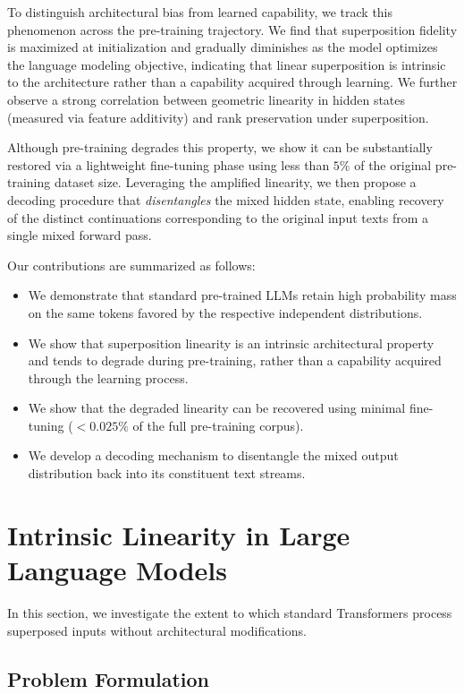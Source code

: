 \documentclass{article}
\theoremstyle{plain}
\theoremstyle{definition}
\theoremstyle{remark}
\begin{document}
To distinguish architectural bias from learned capability, we track this phenomenon across the pre-training trajectory. We find that superposition fidelity is maximized at initialization and gradually diminishes as the model optimizes the language modeling objective, indicating that linear superposition is intrinsic to the architecture rather than a capability acquired through learning. We further observe a strong correlation between geometric linearity in hidden states (measured via feature additivity) and rank preservation under superposition.

Although pre-training degrades this property, we show it can be substantially restored via a lightweight fine-tuning phase using less than $5\%$ of the original pre-training dataset size. Leveraging the amplified linearity, we then propose a decoding procedure that \textit{disentangles} the mixed hidden state, enabling recovery of the distinct continuations corresponding to the original input texts from a single mixed forward pass.

Our contributions are summarized as follows:
\begin{itemize}
    \item We demonstrate that standard pre-trained LLMs retain high probability mass on the same tokens favored by the respective independent distributions.
    \item We show that superposition linearity is an intrinsic architectural property and tends to degrade during pre-training, rather than a capability acquired through the learning process.
    \item We show that the degraded linearity can be recovered using minimal fine-tuning ($<0.025\%$ of the full pre-training corpus).
    \item We develop a decoding mechanism to disentangle the mixed output distribution back into its constituent text streams.
\end{itemize}

\section{Intrinsic Linearity in Large Language Models}
\label{sec:intrinsic_linearity}

In this section, we investigate the extent to which standard Transformers process superposed inputs without architectural modifications.

\subsection{Problem Formulation}
\label{subsec:formulation}
\end{document}
